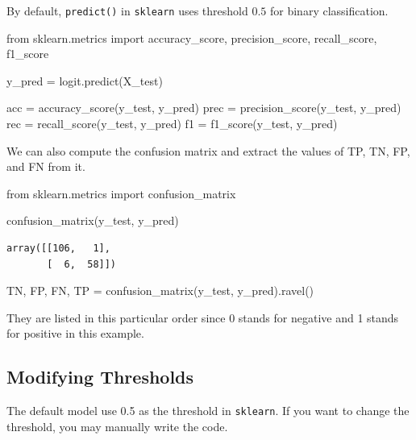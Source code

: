 \documentclass[
  letterpaper,
  DIV=11,
  numbers=noendperiod]{scrreprt}
\newenvironment{Shaded}{\begin{snugshade}}{\end{snugshade}}
\newcommand{\ImportTok}[1]{\textcolor[rgb]{0.00,0.46,0.62}{#1}}
\newcommand{\NormalTok}[1]{\textcolor[rgb]{0.00,0.23,0.31}{#1}}
\newcommand{\OperatorTok}[1]{\textcolor[rgb]{0.37,0.37,0.37}{#1}}
\theoremstyle{definition}
\theoremstyle{definition}
\theoremstyle{plain}
\theoremstyle{plain}
\theoremstyle{remark}
\begin{document}
By default, \texttt{predict()} in \texttt{sklearn} uses threshold
\(0.5\) for binary classification.

\begin{Shaded}
\begin{Highlighting}[]
\ImportTok{from}\NormalTok{ sklearn.metrics }\ImportTok{import}\NormalTok{ accuracy\_score, precision\_score, recall\_score, f1\_score}

\NormalTok{y\_pred }\OperatorTok{=}\NormalTok{ logit.predict(X\_test)}

\NormalTok{acc }\OperatorTok{=}\NormalTok{ accuracy\_score(y\_test, y\_pred)}
\NormalTok{prec }\OperatorTok{=}\NormalTok{ precision\_score(y\_test, y\_pred)}
\NormalTok{rec }\OperatorTok{=}\NormalTok{ recall\_score(y\_test, y\_pred)}
\NormalTok{f1 }\OperatorTok{=}\NormalTok{ f1\_score(y\_test, y\_pred)}
\end{Highlighting}
\end{Shaded}

We can also compute the confusion matrix and extract the values of TP,
TN, FP, and FN from it.

\begin{Shaded}
\begin{Highlighting}[]
\ImportTok{from}\NormalTok{ sklearn.metrics }\ImportTok{import}\NormalTok{ confusion\_matrix}

\NormalTok{confusion\_matrix(y\_test, y\_pred)}
\end{Highlighting}
\end{Shaded}

\begin{verbatim}
array([[106,   1],
       [  6,  58]])
\end{verbatim}

\begin{Shaded}
\begin{Highlighting}[]
\NormalTok{TN, FP, FN, TP }\OperatorTok{=}\NormalTok{ confusion\_matrix(y\_test, y\_pred).ravel()}
\end{Highlighting}
\end{Shaded}

They are listed in this particular order since 0 stands for negative and
1 stands for positive in this example.

\subsection{Modifying Thresholds}\label{modifying-thresholds}

The default model use 0.5 as the threshold in \texttt{sklearn}. If you
want to change the threshold, you may manually write the code.
\end{document}
